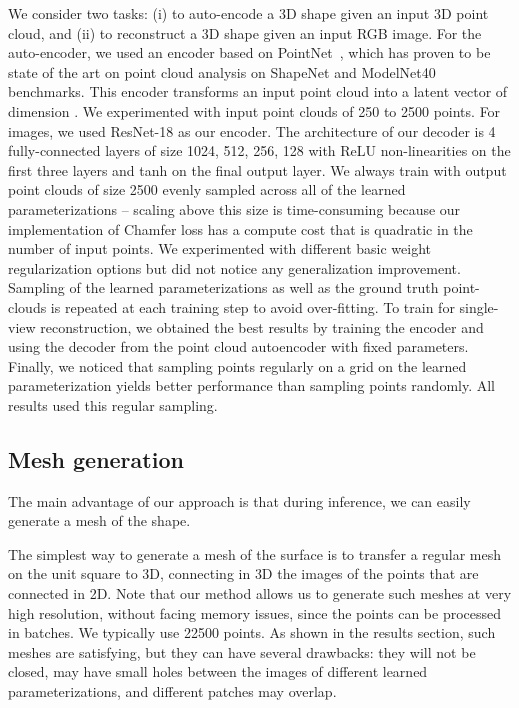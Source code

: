 \documentclass[10pt,twocolumn,letterpaper]{article}
\newcommand{\myparagraph}[1]{\vspace{3pt}\noindent{\bf #1}}
\begin{document}
We consider two tasks: (i) to auto-encode a 3D shape given an input 3D point cloud, and (ii) to reconstruct a 3D shape given an input RGB image. For the auto-encoder, we used an encoder based on PointNet~\cite{qi2016pointnet}, which has proven to be state of the art on point cloud analysis on ShapeNet and ModelNet40 benchmarks. 
This encoder transforms an input point cloud into a latent vector of dimension . We experimented with input point clouds of 250 to 2500 points. For images, we used ResNet-18 \cite{he2016deep} as our encoder. The architecture of our decoder is 4 fully-connected layers of size 1024, 512, 256, 128 with ReLU non-linearities on the first three layers and tanh on the final output layer. We always train with output point clouds of size 2500 evenly sampled across all of the learned parameterizations -- scaling above this size is time-consuming because our implementation of Chamfer loss has a compute cost that is quadratic in the number of input points. 
We experimented with different basic weight regularization options but did not notice any generalization improvement.
Sampling of the learned parameterizations as well as the ground truth point-clouds is repeated at each training step to avoid over-fitting. To train for single-view reconstruction, we obtained the best results by training the encoder and using the decoder from the point cloud autoencoder with fixed parameters.
Finally, we noticed that sampling points regularly on a grid on the learned parameterization yields better performance than sampling points randomly. All results used this regular sampling.






\subsection{Mesh generation}
\label{sec:mesh}
The main advantage of our approach is that during inference, we can easily generate a mesh of the shape.


\myparagraph{Propagate the patch-grid edges to the 3D points.} 
The simplest way to generate a mesh of the surface is to transfer a regular mesh on the unit square to 3D, connecting in 3D the images of the points that are connected in 2D. Note that our method allows us to generate such meshes at very high resolution, without facing memory issues, since the points can be processed in batches. We typically use 22500 points. As shown in the results section, such meshes are satisfying, but they can have several drawbacks: they will not be closed, may have small holes between the images of different learned parameterizations, and different patches may overlap. 
\end{document}
